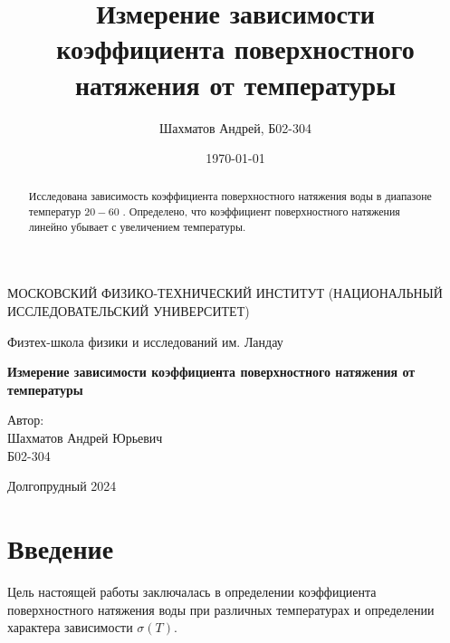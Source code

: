 \documentclass[12pt]{article}
\title{Измерение зависимости коэффициента поверхностного натяжения от температуры}
\author{Шахматов Андрей, Б02-304}
\date{\today}
\begin{document}
\begin{titlepage}
    \begin{center}
        {\large МОСКОВСКИЙ ФИЗИКО-ТЕХНИЧЕСКИЙ ИНСТИТУТ (НАЦИОНАЛЬНЫЙ ИССЛЕДОВАТЕЛЬСКИЙ УНИВЕРСИТЕТ)}
    \end{center}
    \begin{center}
        {\large Физтех-школа физики и исследований им. Ландау}
    \end{center}
    
    
    \vspace{3cm}
    {\huge
        \begin{center}
            \textbf{Измерение зависимости коэффициента поверхностного натяжения от температуры}
        \end{center}
    }
    \vspace{2cm}
    \begin{flushright}
        {\LARGE Автор:\\ Шахматов Андрей Юрьевич \\
            \vspace{0.2cm}
            Б02-304}
    \end{flushright}
    \vspace{7 cm}
    \begin{center}
        Долгопрудный 2024
    \end{center}
\end{titlepage}


\begin{abstract}
    Исследована зависимость коэффициента поверхностного натяжения воды в диапазоне температур $20 - 60$ \textcelsius. Определено, что 
    коэффициент поверхностного натяжения линейно убывает с увеличением температуры.    
\end{abstract}

\tableofcontents

\section{Введение}
Цель настоящей работы заключалась в определении коэффициента поверхностного натяжения воды при различных температурах и 
определении характера зависимости $\sigma(T)$.  
\end{document}
